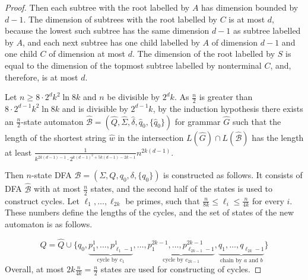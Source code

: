 \documentclass[runningheads]{llncs}
\begin{document}
\begin{proof}
Then each subtree with the root labelled by $A$ has dimension bounded by $d-1$.
The dimension of subtrees with the root labelled by $C$ is at most $d$, because 
the lowest such subtree has the same dimension $d-1$ as subtree labelled by $A$,
and each next subtree has one child labelled by $A$ of dimension $d-1$ and one child $C$ of
dimension at most $d$.
The dimension of the root labelled by $S$ is equal to the dimension of the topmost
subtree labelled by nonterminal $C$, and, therefore, is at most $d$.

Let $n \geqslant 8 \cdot 2^d k^2 \ln 8k$ and $n$ be divisible by $2^dk$.
As $\frac{n}{2}$ is greater than $8 \cdot 2^{d-1} k^2 \ln 8k$ and is divisible by $2^{d-1}k$, 
by the induction hypothesis there exists an $\frac{n}{2}$-state automaton 
$\widehat{\mathcal{B}} = (\widehat{Q}, \widehat{\Sigma}, \widehat{\delta}, \widehat{q}_0, \{\widehat{q}_0\})$
 for grammar $\widehat{G}$ such that the length of the shortest string $\widehat{w}$ in the intersection
$L(\widehat{G}) \cap L(\widehat{\mathcal{B}})$ has the length at least 
$\frac{1}{k^{2k(d-1)-1} \cdot 2^{k(d-1)^2 + 5k(d-1) -2k -1}} n^{2k(d-1)}$.

Then $n$-state DFA $\mathcal{B} = (\Sigma, Q, q_0, \delta, \{q_0\})$
is constructed as follows. It consists of DFA $\widehat{\mathcal{B}}$ with 
at most $\frac{n}{2}$ states, and the second half of the states is used to 
construct cycles. Let $\ell_1, \ldots, \ell_{2k}$ be primes, such that 
$\frac{n}{8k} \leqslant \ell_i \leqslant \frac{n}{4k}$ for every $i$. 
These numbers define the lengths of the cycles, and the set of states of the new automaton
is as follows.

\begin{equation*}
	Q = \widehat{Q} \cup \{q_0,
		\underbrace{p^1_1, \ldots, p^1_{\ell_1-1}}_{\text{cycle by $c_1$}},
		\ldots,
		\underbrace{p^{2k-1}_1, \ldots, p^{2k-1}_{\ell_{2k-1}-1}}_{\text{cycle by $c_{2k-1}$}},
		\underbrace{q_1, \ldots, q_{\ell_{2k}-1}}_{\text{chain by $a$ and $b$}}\}
\end{equation*}
Overall, at most $2k \frac{n}{4k} = \frac{n}{2}$ states are used for constructing of cycles.


\end{proof}
\end{document}

